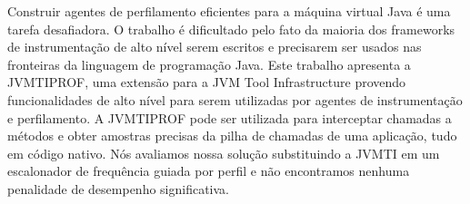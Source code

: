 Construir agentes de perfilamento eficientes para a máquina virtual Java é uma tarefa desafiadora. O trabalho é dificultado pelo fato da maioria dos frameworks de instrumentação de alto nível serem escritos e precisarem ser usados nas fronteiras da linguagem de programação Java. Este trabalho apresenta a JVMTIPROF, uma extensão para a JVM Tool Infrastructure provendo funcionalidades de alto nível para serem utilizadas por agentes de instrumentação e perfilamento. A JVMTIPROF pode ser utilizada para interceptar chamadas a métodos e obter amostras precisas da pilha de chamadas de uma aplicação, tudo em código nativo. Nós avaliamos nossa solução substituindo a JVMTI em um escalonador de frequência guiada por perfil e não encontramos nenhuma penalidade de desempenho significativa.
